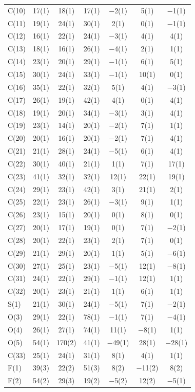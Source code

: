 \begin{center}
{\begin{supertabular}{lcccccc}
C(10)&17(1) &18(1)&17(1) &$-$2(1)&5(1) &$-$1(1)\\
C(11)&19(1) &24(1)&30(1) &2(1)&0(1) &$-$1(1)\\
C(12)&16(1) &22(1)&24(1) &$-$3(1)&4(1) &4(1)\\
C(13)&18(1) &16(1)&26(1) &$-$4(1)&2(1) &1(1)\\
C(14)&23(1) &20(1)&29(1) &$-$1(1)&6(1) &5(1)\\
C(15)&30(1) &24(1)&33(1) &$-$1(1)&10(1) &0(1)\\
C(16)&35(1) &22(1)&32(1) &5(1)&4(1) &$-$3(1)\\
C(17)&26(1) &19(1)&42(1) &4(1)&0(1) &4(1)\\
C(18)&19(1) &20(1)&34(1) &$-$3(1)&3(1) &4(1)\\
C(19)&23(1) &14(1)&20(1) &$-$2(1)&7(1) &1(1)\\
C(20)&20(1) &16(1)&20(1) &$-$2(1)&7(1) &4(1)\\
C(21)&21(1) &28(1)&24(1) &$-$5(1)&6(1) &4(1)\\
C(22)&30(1) &40(1)&21(1) &1(1)&7(1) &17(1)\\
C(23)&41(1) &32(1)&32(1) &12(1)&22(1) &19(1)\\
C(24)&29(1) &23(1)&42(1) &3(1)&21(1) &2(1)\\
C(25)&22(1) &23(1)&26(1) &$-$3(1)&9(1) &1(1)\\
C(26)&23(1) &15(1)&20(1) &0(1)&8(1) &0(1)\\
C(27)&20(1) &17(1)&19(1) &0(1)&7(1) &$-$2(1)\\
C(28)&20(1) &22(1)&23(1) &2(1)&7(1) &0(1)\\
C(29)&21(1) &29(1)&20(1) &1(1)&5(1) &$-$6(1)\\
C(30)&27(1) &25(1)&23(1) &$-$5(1)&12(1) &$-$8(1)\\
C(31)&24(1) &22(1)&29(1) &$-$1(1)&12(1) &1(1)\\
C(32)&20(1) &23(1)&21(1) &1(1)&6(1) &1(1)\\
S(1)&21(1) &30(1)&24(1) &$-$5(1)&7(1) &$-$2(1)\\
O(3)&29(1) &22(1)&78(1) &$-$1(1)&7(1) &$-$4(1)\\
O(4)&26(1) &27(1)&74(1) &11(1)&$-$8(1) &1(1)\\
O(5)&54(1) &170(2)&41(1) &$-$49(1)&28(1) &$-$28(1)\\
C(33)&25(1) &24(1)&31(1) &8(1)&4(1) &1(1)\\
F(1)&39(3) &22(2)&51(3) &8(2)&$-$11(2) &8(2)\\
F(2)&54(2) &29(3)&19(2) &$-$5(2)&12(2) &$-$5(1)\\

\end{supertabular}}
\end{center}
